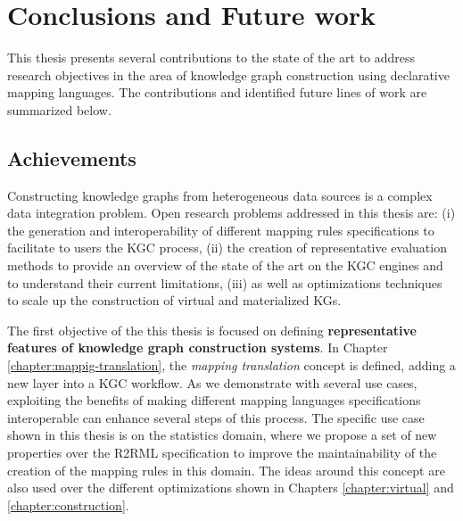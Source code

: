 \chapter{Conclusions and Future work}
\label{chap:conc}
This thesis presents several contributions to the state of the art to address research objectives in the area of knowledge graph construction using declarative mapping languages. The contributions and identified future lines of work are summarized below.


\section{Achievements}
Constructing knowledge graphs from heterogeneous data sources is a complex data integration problem. Open research problems addressed in this thesis are: (i) the generation and interoperability of different mapping rules specifications to facilitate to users the KGC process, (ii) the creation of representative evaluation methods to provide an overview of the state of the art on the KGC engines and to understand their current limitations, (iii) as well as optimizations techniques to scale up the construction of virtual and materialized KGs. 
 
 
The first objective of the this thesis is focused on defining \textbf{representative features of knowledge graph construction systems}. In Chapter \ref{chapter:mappig-translation}, the \textit{mapping translation} concept is defined, adding a new layer into a KGC workflow. As we demonstrate with several use cases, exploiting the benefits of making  different mapping languages specifications interoperable can enhance several steps of this process. The specific use case shown in this thesis is on the statistics domain, where we propose a set of new properties over the R2RML specification to improve the maintainability of the creation of the mapping rules in this domain. The ideas around this concept are also used over the different optimizations shown in Chapters \ref{chapter:virtual} and \ref{chapter:construction}.

